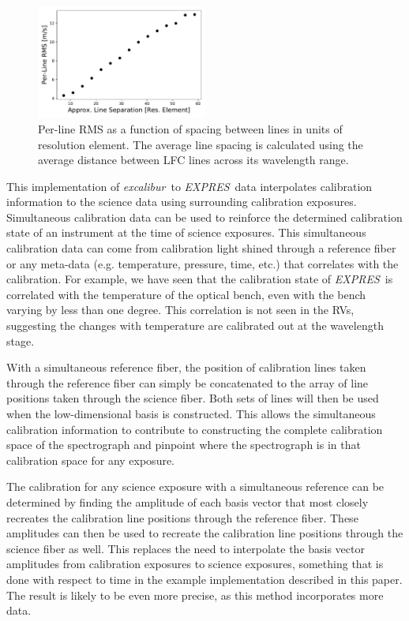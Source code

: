 \documentclass[modern]{aastex63}
\newcommand{\project}[1]{\textsl{#1}}
\newcommand{\name}{\project{excalibur}}
\newcommand{\acronym}[1]{{\small{#1}}}
\newcommand{\expres}{\project{\acronym{EXPRES}}}
\begin{document}
\begin{figure}[h]
\centering
\includegraphics[width=0.5\textwidth]{Figures/lfcDensityTest.pdf}
\caption{Per-line RMS as a function of spacing between lines in units of resolution element.  The average line spacing is calculated using the average distance between LFC lines across its wavelength range.}
\label{fig:density}
\end{figure}

This implementation of \name\ to \expres\ data interpolates calibration information to the science data using surrounding calibration exposures.  Simultaneous calibration data can be used to reinforce the determined calibration state of an instrument at the time of science exposures.  This simultaneous calibration data can come from calibration light shined through a reference fiber or any meta-data (e.g. temperature, pressure, time, etc.) that correlates with the calibration.  For example, we have seen that the calibration state of \expres\ is correlated with the temperature of the optical bench, even with the bench varying by less than one degree.  This correlation is not seen in the RVs, suggesting the changes with temperature are calibrated out at the wavelength stage.

With a simultaneous reference fiber, the position of calibration lines taken through the reference fiber can simply be concatenated to the array of line positions taken through the science fiber.  Both sets of lines will then be used when the low-dimensional basis is constructed.  This allows the simultaneous calibration information to contribute to constructing the complete calibration space of the spectrograph and pinpoint where the spectrograph is in that calibration space for any exposure.

The calibration for any science exposure with a simultaneous reference can be determined by finding the amplitude of each basis vector that most closely recreates the calibration line positions through the reference fiber.  These amplitudes can then be used to recreate the calibration line positions through the science fiber as well.  This replaces the need to interpolate the basis vector amplitudes from calibration exposures to science exposures, something that is done with respect to time in the example implementation described in this paper.  The result is likely to be even more precise, as this method incorporates more data.
\end{document}
